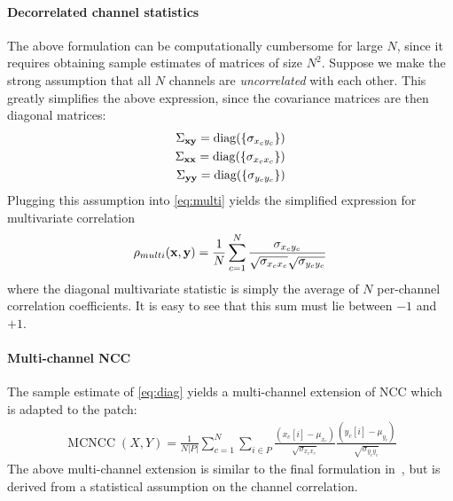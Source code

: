 \documentclass[twocolumn]{svjour3}           %
\begin{document}
\paragraph{Decorrelated channel statistics} The above formulation can be
computationally cumbersome for large $N$, since it requires obtaining sample
estimates of matrices of size $N^2$. Suppose we make the strong assumption that
all $N$ channels are {\em uncorrelated} with each other. This greatly
simplifies the above expression, since the covariance matrices are then
diagonal matrices:
\begin{align*}
\Sigma_{\bf xy} = \operatorname{diag}(\{\sigma_{x_cy_c}\}) \\
\Sigma_{\bf xx} = \operatorname{diag}(\{\sigma_{x_cx_c}\}) \\
\Sigma_{\bf yy} = \operatorname{diag}(\{\sigma_{y_cy_c}\})
\end{align*}
Plugging this assumption into \eqref{eq:multi} yields the simplified expression
for multivariate correlation
\begin{align}
 \rho_{multi}({\bf x},{\bf y}) = \frac{1}{N} \sum_{c=1}^N \frac{\sigma_{x_cy_c}}{\sqrt{\sigma_{x_cx_c}} \sqrt{\sigma_{y_cy_c}}} \label{eq:diag}
\end{align}
where the diagonal multivariate statistic is simply the average of $N$ per-channel
correlation coefficients. It is easy to see that this sum must lie between $-1$
and $+1$.

\paragraph{Multi-channel NCC}  The sample estimate of \eqref{eq:diag} yields a
multi-channel extension of NCC which is adapted to the patch:
{\small \begin{align}
  \nonumber \operatorname{MCNCC}(X,Y) = \frac{1}{N|P|} \sum_{c=1}^N\sum_{i \in P}
                              \frac{(x_c[i] - \mu_{x_c})}{\sqrt{\sigma_{x_cx_c}}}
                              \frac{(y_c[i] - \mu_{y_c})}{\sqrt{\sigma_{y_cy_c}}}
\end{align}}
The above multi-channel extension is similar to the final formulation
in~\cite{fisher1995multi}, but is derived from a statistical assumption
on the channel correlation.
\end{document}
